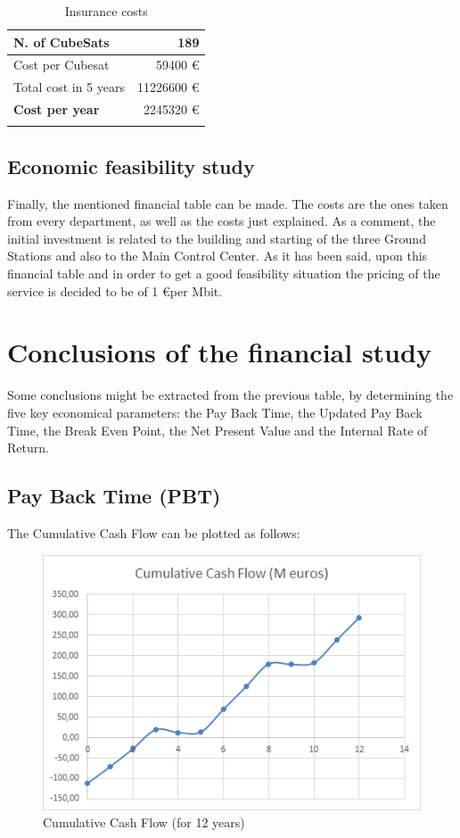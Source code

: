 \begin{longtable}{| l | r |}
  \hline
	N. of CubeSats & 189 \\
  \hline
    Cost per Cubesat & 59400 \euro  \\
  \hline
    Total cost in 5 years & 11226600 \euro \\
  \hline
  	\textbf{Cost per year} & 2245320 \euro \\
  \hline
\caption[Insurance costs]{Insurance costs}
\end{longtable}

\subsection{Economic feasibility study}

Finally, the mentioned financial table can be made. The costs are the ones taken from every department, as well as the costs just explained. As a comment, the initial investment is related to the building and starting of the three Ground Stations and also to the Main Control Center. As it has been said, upon this financial table and in order to get a good feasibility situation the pricing of the service is decided to be of 1 \euro  per Mbit. 



\section{Conclusions of the financial study}
Some conclusions might be extracted from the previous table, by determining the five key economical parameters: the Pay Back Time, the Updated Pay Back Time, the Break Even Point, the Net Present Value and the Internal Rate of Return. 

\subsection{Pay Back Time (PBT)}
The Cumulative Cash Flow can be plotted as follows:

\begin{figure}[H]
	\centering
	\includegraphics{CCF.png}
	\caption[Cumulative Cash Flow]{Cumulative Cash Flow (for 12 years)}
\end{figure}

